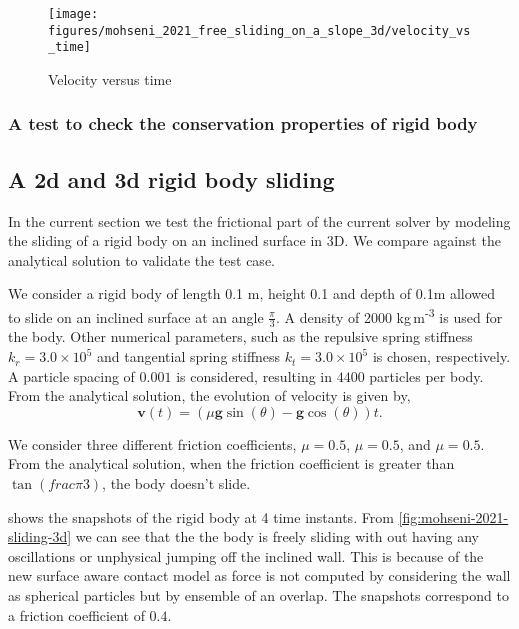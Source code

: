 \documentclass[preprint,12pt]{elsarticle}
\newcommand{\teng}[1]{\ensuremath{\boldsymbol{#1}}}
\newcommand{\ten}[1]{\ensuremath{\mathbf{#1}}}
\begin{document}
\begin{figure}[!htpb]
  \centering
  \texttt{[image: figures/mohseni\_2021\_free\_sliding\_on\_a\_slope\_3d/velocity\_vs\_time]}
  \caption{Velocity versus time}
\label{fig:results-solid-sliding-velocity-vs-time}
\end{figure}


\subsubsection{A test to check the conservation properties of rigid body}
\label{sec:conservation-of-rb-properties}



\subsection{A 2d and 3d rigid body sliding}
\label{sec:rigid-body-sliding}

In the current section we test the frictional part of the current solver by
modeling the sliding of a rigid body on an inclined surface in 3D. We compare
against the analytical solution to validate the test case.

We consider a rigid body of length 0.1 m, height 0.1 and depth of 0.1m allowed
to slide on an inclined surface at an angle $\frac{\pi}{3}$. A density of 2000
kg\,m\textsuperscript{-3} is used for the body. Other numerical parameters,
such as the repulsive spring stiffness $k_r=3.0 \times 10^{5}$ and tangential
spring stiffness $k_t=3.0 \times 10^{5}$ is chosen, respectively. A particle
spacing of $0.001$ is considered, resulting in $4400$ particles per body. From
the analytical solution, the evolution of velocity is given by,
\begin{equation}
  \label{eq:ce}
  \ten{v}(t) = (\mu \teng{g} \sin (\theta) - \teng{g} \cos (\theta)) t.
\end{equation}


We consider three different friction coefficients, $\mu=0.5$, $\mu=0.5$, and
$\mu=0.5$. From the analytical solution, when the friction coefficient is
greater than $\tan(frac{\pi}{3})$, the body doesn't slide.

 shows the snapshots of the rigid body at 4
time instants. From \cref{fig:mohseni-2021-sliding-3d} we can see that the the
body is freely sliding with out having any oscillations or unphysical jumping
off the inclined wall. This is because of the new surface aware contact model
as force is not computed by considering the wall as spherical particles but by
ensemble of an overlap. The snapshots correspond to a friction coefficient of $0.4$.
\end{document}
